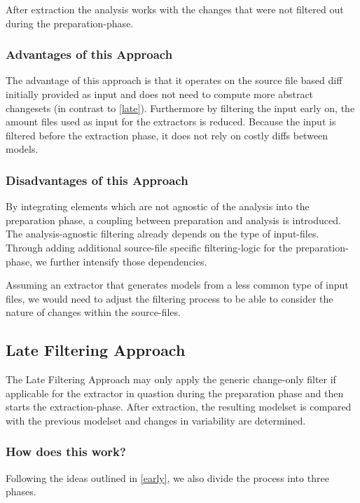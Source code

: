 \documentclass[a4paper]{article}
\begin{document}
After extraction the analysis works with the changes that were not filtered out during the preparation-phase.

\subsubsection{Advantages of this Approach}

The advantage of this approach is that it operates on the source file based diff initially provided as input and does not need to compute more abstract changesets (in contrast to \autoref{late}). Furthermore by filtering the input early on, the amount files used as input for the extractors is reduced. Because the input is filtered before the extraction phase, it does not rely on costly diffs between models.

\subsubsection{Disadvantages of this Approach}

By integrating elements which are not agnostic of the analysis into the preparation phase, a coupling between preparation and analysis is introduced. The analysis-agnostic filtering already depends on the type of input-files. Through adding additional source-file specific filtering-logic for the preparation-phase, we further intensify those dependencies.

Assuming an extractor that generates models from a less common type of input files, we would need to adjust the filtering process to be able to consider the nature of changes within the source-files.

\subsection{Late Filtering Approach} \label{late}

The Late Filtering Approach may only apply the generic change-only filter if applicable for the extractor in quastion during the preparation phase and then starts the extraction-phase. After extraction, the resulting modelset is compared with the previous modelset and changes in variability are determined.

\subsubsection{How does this work?}

Following the ideas outlined in \autoref{early}, we also divide the process into three phases.
\end{document}
